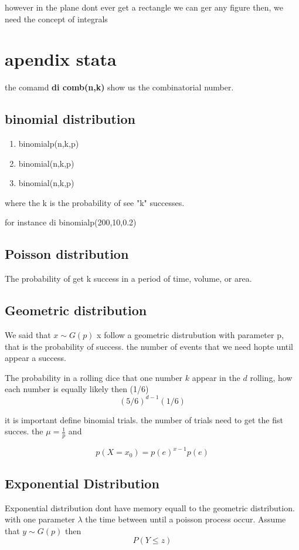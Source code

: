 \documentclass[10pt,a4paper]{article}
\begin{document}
however in the plane dont ever get a rectangle we can ger any figure then, we need the concept of integrals 



\section*{apendix  stata}

the comamd  \textbf{di comb(n,k)} show us the combinatorial number.

\subsection*{binomial  distribution}

\begin{enumerate}
\item binomialp(n,k,p) 
\item binomial(n,k,p)
\item binomial(n,k,p)
\end{enumerate}

where the k is the probability of see "k" successes. 

for instance di binomialp(200,10,0.2)


\subsection{Poisson distribution}
The probability of get k success in a period of time, volume, or area.






\subsection{Geometric distribution}
We said that $x \sim G(p)$ x follow a geometric distrubution with parameter p, that is the probability 
of success. the number of events that we need hopte until appear a success.

The probability in a rolling dice that one number $k$ appear in the $d$  rolling, 
how each number is equally likely then (1/6) $$(5/6)^{d-1}(1/6)$$ 

it is important define binomial trials.
the number of trials need to get the fist succes.
the $\mu = \frac{1}{p}$ and 

$$p(X=x_{0})=p(e)^{x-1}p(e)$$

\subsection{Exponential Distribution}
Exponential distribution dont have memory equall to the geometric distribution.
with one parameter $\lambda$  the time between until a  poisson process occur.
Assume that $y \sim G(p)$ then
$$ P(Y \leq z) 	$$
\end{document}
